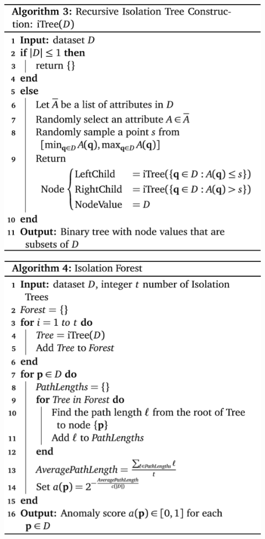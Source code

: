 \documentclass[20pt,landscape,footrule,headrule]{foils}
\begin{document}
\begin{center}\includegraphics[height=\textheight]{Images/Algorithm3}
\end{center}
\begin{center}\includegraphics[height=\textheight]{Images/Algorithm4}
\end{center}
\end{document}
